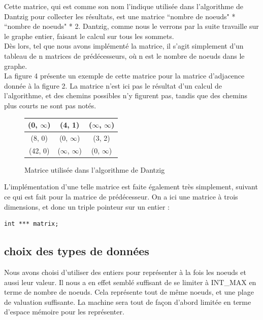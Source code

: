\documentclass[a4paper,12pt,final] {article}
\begin{document}
Cette matrice, qui est comme son nom l'indique utilisée dans l'algorithme de Dantzig pour collecter les résultats, est une matrice ``nombre de noeuds" * ``nombre de noeuds" * 2. Dantzig, comme nous le verrons par la suite travaille sur le graphe entier, faisant  le calcul sur tous les sommets.\\

Dès lors, tel que nous avons implémenté la matrice, il s'agit simplement d'un tableau de n matrices de prédécesseurs, où n est le nombre de noeuds dans le graphe.\\

La figure 4 présente un exemple de cette matrice pour la matrice d'adjacence donnée à la figure 2. La matrice n'est ici pas le résultat d'un calcul de l'algorithme, et des chemins possibles n'y figurent pas, tandis que des chemins plus courts ne sont pas notés.\\ %

\begin{figure}[htdp]
\begin{center}
\begin{tabular}{|c|c|c|}
\hline
(0, $\infty$) & (4, 1) & ($\infty$, $\infty$) \\
\hline
(8, 0) & (0, $\infty$) & (3, 2)\\
\hline
(42, 0) & ($\infty$, $\infty$) & (0, $\infty$)\\ 
\hline
\end{tabular}
\end{center}
\caption{Matrice utilisée dans l'algorithme de Dantzig}
\end{figure}

L'implémentation d'une telle matrice est faite également très simplement, suivant ce qui est fait pour la matrice de prédécesseur. On a ici une matrice à trois dimensions, et donc un triple pointeur sur un entier :
\begin{lstlisting}
int *** matrix;
\end{lstlisting}

\subsection{choix des types de données}

Nous avons choisi d'utiliser des entiers pour représenter à la fois les noeuds et aussi leur valeur. Il nous a en effet semblé suffisant de se limiter à INT\_MAX en terme de nombre de noeuds. Cela représente tout de même  noeuds, et une plage de valuation suffisante. La machine sera tout de façon d'abord limitée en terme d'espace mémoire pour les représenter.\\
\end{document}
